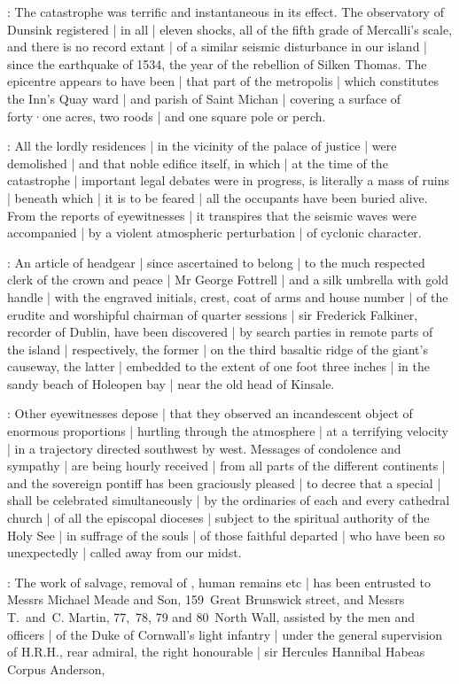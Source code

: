 :
The catastrophe was terrific and instantaneous in its effect.
The observatory of Dunsink registered |
in all |
eleven shocks,
all of the fifth grade of Mercalli's scale,
and there is no record extant |
of a similar seismic disturbance in our island |
since the earthquake of 1534,
the year of the rebellion of Silken Thomas.
The epicentre appears to have been |
that part of the metropolis |
which constitutes the Inn's Quay ward |
and parish of Saint Michan |
covering a surface of forty·one acres,
two roods |
and one square pole or perch.

:
All the lordly residences |
in the vicinity of the palace of justice |
were demolished |
and that noble edifice itself,
in which |
at the time of the catastrophe |
important legal debates were in progress,
is literally a mass of ruins |
beneath which |
it is to be feared |
all the occupants have been buried alive.
From the reports of eyewitnesses |
it transpires that the seismic waves were accompanied |
by a violent atmospheric perturbation |
of cyclonic character.

:
An article of headgear |
since ascertained to belong |
to the much respected clerk of the crown and peace |
Mr George Fottrell |
and a silk umbrella with gold handle |
with the engraved initials,
crest,
coat of arms
and house number |
of the erudite and worshipful chairman of quarter sessions |
sir Frederick Falkiner,
recorder of Dublin,
have been discovered |
by search parties in remote parts of the island |
respectively,
the former |
on the third basaltic ridge of the giant's causeway,
the latter |
embedded to the extent of one foot three inches |
in the sandy beach of Holeopen bay |
near the old head of Kinsale.

:
Other eyewitnesses depose |
that they observed an incandescent object of enormous proportions |
hurtling through the atmosphere |
at a terrifying velocity |
in a trajectory directed southwest by west.
Messages of condolence and sympathy |
are being hourly received |
from all parts of the different continents |
and the sovereign pontiff has been graciously pleased |
to decree that a special  |
shall be celebrated simultaneously |
by the ordinaries of each and every cathedral church |
of all the episcopal dioceses |
subject to the spiritual authority of the Holy See |
in suffrage of the souls |
of those faithful departed |
who have been so unexpectedly |
called away from our midst.

:
The work of salvage,
removal of ,
human remains etc |
has been entrusted to Messrs Michael Meade and Son,
159~Great Brunswick street,
and Messrs T.~and~C. Martin,
77,~78, 79 and 80~North Wall,
assisted by the men and officers |
of the Duke of Cornwall's light infantry |
under the general supervision of H.R.H.,
rear admiral,
the right honourable |
sir Hercules Hannibal Habeas Corpus Anderson,

